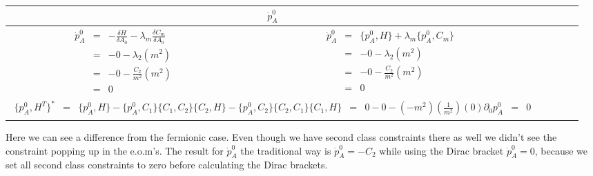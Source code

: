 \documentclass[aps,preprint,preprintnumbers,nofootinbib,showpacs,prd]{revtex4-1}
\newcommand{\ba}{\begin{array}}
\newcommand{\ea}{\end{array}}
\begin{document}
\begin{center}
    \begin{tabular}{ | c c |}
    \hline
    \multicolumn{2}{|c|}{$\dot p^0_A$} \\
    \hline
    $\ba {rcl}
\dot p^0_A & = & -\frac{\delta H}{\delta A_0} - \lambda_m \frac{\delta C_m}{\delta A_0} \\
& = & - 0 - \lambda_2 (m^2) \\
& = & - 0 - \frac{C_2}{m^2} (m^2) \\
& = & 0
\ea$
     &
    $\ba {rcl}
\dot p^0_A & = & \{p^0_A, H\} + \lambda_m \{p^0_A,C_m\} \\
& = & - 0 - \lambda_2 (m^2) \\
& = & - 0 - \frac{C_2}{m^2} (m^2) \\
& = & 0
\ea$
      \\ \cline{1-2}
    \multicolumn{2}{|c|}{
   $\ba {rcl}
\{p^0_A, H^T\}^* & = & \{p^0_A, H\} - \{p^0_A, C_1\}\{C_1, C_2\}\{C_2, H\} - \{p^0_A, C_2\}\{C_2, C_1\}\{C_1, H\}  \\
& = & 0 - 0 -(-m^2) \left ( \frac{1}{m^2} \right )(0) \\
\partial_0 p^0_A & = & 0
\ea$
    } \\
    \hline
    \end{tabular}
\end{center}
%
Here we can see a difference from the fermionic case. Even though we have second class constraints there as well we didn't see the constraint popping up in the e.o.m's. The result for $\dot p^0_A$ the traditional way is $\dot p^0_A = -C_2$ while using the Dirac bracket $\dot p^0_A = 0$, because we set all second class constraints to zero before calculating the Dirac brackets. 
\end{document}
